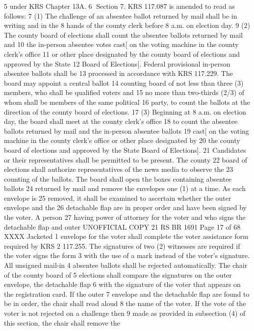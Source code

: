 5 under KRS Chapter 13A.
6 Section 7. KRS 117.087 is amended to read as follows:
7 (1) The challenge of an absentee ballot returned by mail shall be in writing and in the
8 hands of the county clerk before 8 a.m. on election day.
9 (2) The county board of elections shall count the absentee ballots returned by mail and
10 the in-person absentee votes cast[ on the voting machine in the county clerk's office
11 or other place designated by the county board of elections and approved by the State
12 Board of Elections]. Federal provisional in-person absentee ballots shall be
13 processed in accordance with KRS 117.229. The board may appoint a central ballot
14 counting board of not less than three (3) members, who shall be qualified voters and
15 no more than two-thirds (2/3) of whom shall be members of the same political
16 party, to count the ballots at the direction of the county board of elections.
17 (3) Beginning at 8 a.m. on election day, the board shall meet at the county clerk's office
18 to count the absentee ballots returned by mail and the in-person absentee ballots
19 cast[ on the voting machine in the county clerk's office or other place designated by
20 the county board of elections and approved by the State Board of Elections].
21 Candidates or their representatives shall be permitted to be present. The county
22 board of elections shall authorize representatives of the news media to observe the
23 counting of the ballots. The board shall open the boxes containing absentee ballots
24 returned by mail and remove the envelopes one (1) at a time. As each envelope is
25 removed, it shall be examined to ascertain whether the outer envelope and the
26 detachable flap are in proper order and have been signed by the voter. A person
27 having power of attorney for the voter and who signs the detachable flap and outer 
UNOFFICIAL COPY 21 RS BR 1691
Page 17 of 68
XXXX Jacketed
1 envelope for the voter shall complete the voter assistance form required by KRS
2 117.255. The signatures of two (2) witnesses are required if the voter signs the form
3 with the use of a mark instead of the voter's signature. All unsigned mail-in
4 absentee ballots shall be rejected automatically. The chair of the county board of
5 elections shall compare the signatures on the outer envelope, the detachable flap
6 with the signature of the voter that appears on the registration card. If the outer
7 envelope and the detachable flap are found to be in order, the chair shall read aloud
8 the name of the voter. If the vote of the voter is not rejected on a challenge then
9 made as provided in subsection (4) of this section, the chair shall remove the
